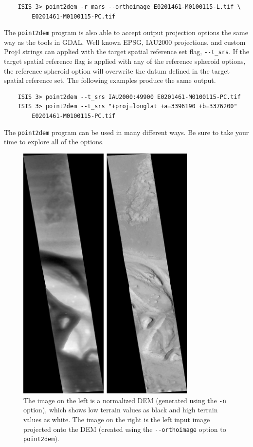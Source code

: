 \begin{verbatim}
    ISIS 3> point2dem -r mars --orthoimage E0201461-M0100115-L.tif \
        E0201461-M0100115-PC.tif
\end{verbatim}

\noindent
The \texttt{point2dem} program is also able to accept output
projection options the same way as the tools in GDAL. Well known EPSG,
IAU2000 projections, and custom Proj4 strings can applied with the
target spatial reference set flag, \texttt{-\/-t\_srs}. If the target
spatial reference flag is applied with any of the reference spheroid
options, the reference spheroid option will overwrite the datum
defined in the target spatial reference set. The following examples
produce the same output.

\begin {verbatim}
    ISIS 3> point2dem --t_srs IAU2000:49900 E0201461-M0100115-PC.tif
    ISIS 3> point2dem --t_srs "+proj=longlat +a=3396190 +b=3376200"
        E0201461-M0100115-PC.tif
\end{verbatim}

\noindent
The \texttt{point2dem} program can be used in many different ways.  Be
sure to take your time to explore all of the options.

\begin{figure}
\hfill
\begin{minipage}{3.5in}
\includegraphics[width=3.5in]{images/p19-norm_ortho.png}
\end{minipage}
\hfill
\begin{minipage}{2in}
\caption[P19 Normalized DEM and Orthophoto]{
    \label{p19-norm_ortho}
	The image on the left is a normalized DEM (generated using the
        \texttt{-n} option), which shows low terrain values as black
        and high terrain values as white.  The image on the right is
        the left input image projected onto the DEM (created using the
        \texttt{-\/-orthoimage} option to \texttt{point2dem}).  }
\end{minipage}
\hfill
\end{figure}


